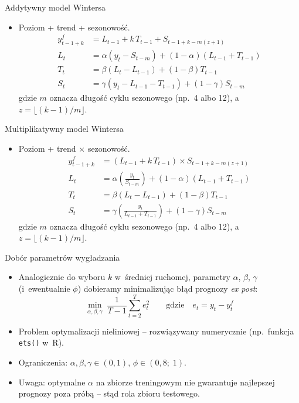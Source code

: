 \documentclass[11pt,usenames,dvipsnames,aspectratio=169]{beamer}
\begin{document}
\begin{frame}{Addytywny model Wintersa}
\begin{itemize}
    \item Poziom + trend + sezonowość.
    \begin{align*}
    y_{t-1+k}^{f} &= L_{t-1}+k\,T_{t-1}+S_{t-1+k-m(z+1)}\\
    L_{t} &= \alpha\left(y_{t}-S_{t-m}\right)+\left(1-\alpha\right)\!\left(L_{t-1}+T_{t-1}\right)\\
    T_{t} &= \beta\left(L_{t}-L_{t-1}\right)+\left(1-\beta\right)T_{t-1}\\
    S_{t} &= \gamma\left(y_{t}-L_{t-1}-T_{t-1}\right)+\left(1-\gamma\right)S_{t-m}
    \end{align*}
    gdzie $m$ oznacza długość cyklu sezonowego (np.\ 4 albo 12), a~$z=\lfloor(k-1)/m\rfloor$.
\end{itemize}
\end{frame}

\begin{frame}{Multiplikatywny model Wintersa}
\begin{itemize}
    \item Poziom + trend $\times$ sezonowość.
    \begin{align*}
    y_{t-1+k}^{f} &= \left(L_{t-1}+k\,T_{t-1}\right)\times S_{t-1+k-m(z+1)}\\
    L_{t} &= \alpha\!\left(\frac{y_{t}}{S_{t-m}}\right)+\left(1-\alpha\right)\!\left(L_{t-1}+T_{t-1}\right)\\
    T_{t} &= \beta\left(L_{t}-L_{t-1}\right)+\left(1-\beta\right)T_{t-1}\\
    S_{t} &= \gamma\!\left(\frac{y_{t}}{L_{t-1}+T_{t-1}}\right)+\left(1-\gamma\right)S_{t-m}
    \end{align*}
    gdzie $m$ oznacza długość cyklu sezonowego (np.\ 4 albo 12), a~$z=\lfloor(k-1)/m\rfloor$.
\end{itemize}
\end{frame}

\begin{frame}{Dobór parametrów wygładzania}
\begin{itemize}
    \item Analogicznie do wyboru $k$ w~średniej ruchomej, parametry $\alpha$, $\beta$, $\gamma$ (i~ewentualnie $\phi$) dobieramy minimalizując błąd prognozy \emph{ex post}:
    \[
    \min_{\alpha,\beta,\gamma}\;\frac{1}{T-1}\sum_{t=2}^{T}e_{t}^{2}
    \qquad\text{gdzie}\quad e_{t}=y_{t}-y_{t}^{f}
    \]
    \item Problem optymalizacji nieliniowej -- rozwiązywany numerycznie (np.~funkcja \texttt{ets()} w~R).
    \item Ograniczenia: $\alpha,\beta,\gamma\in(0,1)$, $\phi\in(0{,}8;\;1)$.
    \item Uwaga: optymalne $\alpha$ na zbiorze treningowym nie gwarantuje najlepszej prognozy poza próbą -- stąd rola zbioru testowego.
\end{itemize}
\end{frame}
\end{document}
